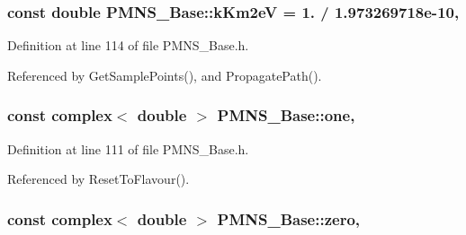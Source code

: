 \subsubsection[{\texorpdfstring{k\+Km2eV}{kKm2eV}}]{\setlength{\rightskip}{0pt plus 5cm}const double P\+M\+N\+S\+\_\+\+Base\+::k\+Km2eV = 1. / 1.\+973269718e-\/10\hspace{0.3cm}{\ttfamily [static]}, {\ttfamily [protected]}}\hypertarget{classOscProb_1_1PMNS__Base_a382ddd7b76ca89b43f22614a2ea7327b}{}\label{classOscProb_1_1PMNS__Base_a382ddd7b76ca89b43f22614a2ea7327b}


Definition at line 114 of file P\+M\+N\+S\+\_\+\+Base.\+h.



Referenced by Get\+Sample\+Points(), and Propagate\+Path().

\subsubsection[{\texorpdfstring{one}{one}}]{\setlength{\rightskip}{0pt plus 5cm}const {\bf complex}$<$ double $>$ P\+M\+N\+S\+\_\+\+Base\+::one\hspace{0.3cm}{\ttfamily [static]}, {\ttfamily [protected]}}\hypertarget{classOscProb_1_1PMNS__Base_ab64aab27448a5aca27565c991a9d173e}{}\label{classOscProb_1_1PMNS__Base_ab64aab27448a5aca27565c991a9d173e}


Definition at line 111 of file P\+M\+N\+S\+\_\+\+Base.\+h.



Referenced by Reset\+To\+Flavour().

\subsubsection[{\texorpdfstring{zero}{zero}}]{\setlength{\rightskip}{0pt plus 5cm}const {\bf complex}$<$ double $>$ P\+M\+N\+S\+\_\+\+Base\+::zero\hspace{0.3cm}{\ttfamily [static]}, {\ttfamily [protected]}}\hypertarget{classOscProb_1_1PMNS__Base_a5c31ed4593cf95feb36fb80c1850d25e}{}\label{classOscProb_1_1PMNS__Base_a5c31ed4593cf95feb36fb80c1850d25e}


